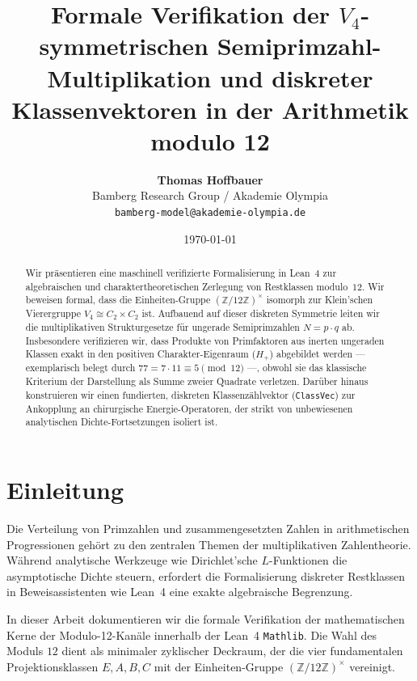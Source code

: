 \documentclass[11pt,a4paper]{article}
\title{\textbf{Formale Verifikation der $V_4$-symmetrischen Semiprimzahl-Multiplikation und diskreter Klassenvektoren in der Arithmetik modulo 12}}
\author{\textbf{Thomas Hoffbauer}\\
	\small Bamberg Research Group / Akademie Olympia\\
	\small \texttt{bamberg-model@akademie-olympia.de}}
\date{\today}
\theoremstyle{definition}
\begin{document}
	
	\maketitle
	
	\begin{abstract}
		Wir präsentieren eine maschinell verifizierte Formalisierung in Lean~4 zur algebraischen und charaktertheoretischen Zerlegung von Restklassen modulo~$12$. Wir beweisen formal, dass die Einheiten-Gruppe $(\mathbb{Z}/12\mathbb{Z})^\times$ isomorph zur Klein'schen Vierergruppe $V_4 \cong C_2 \times C_2$ ist. Aufbauend auf dieser diskreten Symmetrie leiten wir die multiplikativen Strukturgesetze für ungerade Semiprimzahlen $N = p \cdot q$ ab. Insbesondere verifizieren wir, dass Produkte von Primfaktoren aus inerten ungeraden Klassen exakt in den positiven Charakter-Eigenraum ($H_+$) abgebildet werden — exemplarisch belegt durch $77 = 7 \cdot 11 \equiv 5 \pmod{12}$ —, obwohl sie das klassische Kriterium der Darstellung als Summe zweier Quadrate verletzen. Darüber hinaus konstruieren wir einen fundierten, diskreten Klassenzählvektor (\texttt{ClassVec}) zur Ankopplung an chirurgische Energie-Operatoren, der strikt von unbewiesenen analytischen Dichte-Fortsetzungen isoliert ist.
	\end{abstract}
	
	\section{Einleitung}
	
	Die Verteilung von Primzahlen und zusammengesetzten Zahlen in arithmetischen Progressionen gehört zu den zentralen Themen der multiplikativen Zahlentheorie. Während analytische Werkzeuge wie Dirichlet'sche $L$-Funktionen die asymptotische Dichte steuern, erfordert die Formalisierung diskreter Restklassen in Beweisassistenten wie Lean~4 eine exakte algebraische Begrenzung.
	
	In dieser Arbeit dokumentieren wir die formale Verifikation der mathematischen Kerne der Modulo-12-Kanäle innerhalb der Lean~4 \texttt{Mathlib}. Die Wahl des Moduls $12$ dient als minimaler zyklischer Deckraum, der die vier fundamentalen Projektionsklassen $E, A, B, C$ mit der Einheiten-Gruppe $(\mathbb{Z}/12\mathbb{Z})^\times$ vereinigt.
	
\end{document}

